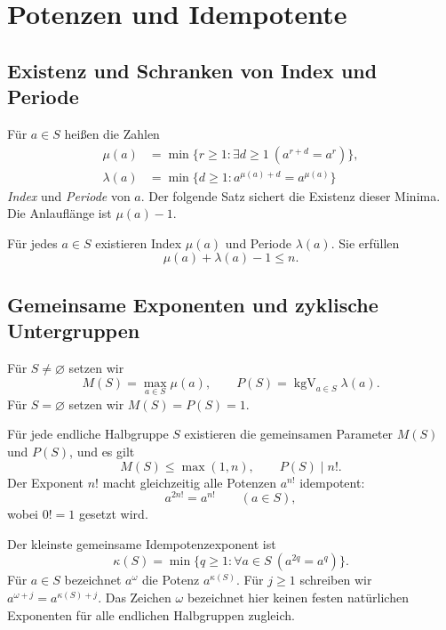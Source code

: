 \chapter{Potenzen und Idempotente}

\section{Existenz und Schranken von Index und Periode}

\begin{definition}
Für $a\in S$ heißen die Zahlen
\begin{align*}
 \mu(a)&=\min\{r\geq1:\exists d\geq1\ (a^{r+d}=a^r)\},\\
 \lambda(a)&=\min\{d\geq1:a^{\mu(a)+d}=a^{\mu(a)}\}
\end{align*}
\emph{Index} und \emph{Periode} von $a$. Der folgende Satz sichert die
Existenz dieser Minima. Die Anlauflänge ist $\mu(a)-1$.
\end{definition}

\begin{theorem}\label{guide:period}
Für jedes $a\in S$ existieren Index $\mu(a)$ und Periode $\lambda(a)$.
Sie erfüllen
\[
 \mu(a)+\lambda(a)-1\leq n.
\]
\cite{projectindex,harju}
\end{theorem}

\section{Gemeinsame Exponenten und zyklische Untergruppen}

\begin{definition}
Für $S\ne\varnothing$ setzen wir
\[
 M(S)=\max_{a\in S}\mu(a),\qquad
 P(S)=\operatorname{kgV}_{a\in S}\lambda(a).
\]
Für $S=\varnothing$ setzen wir $M(S)=P(S)=1$.
\end{definition}

\begin{theorem}\label{guide:uniform}
Für jede endliche Halbgruppe $S$ existieren die gemeinsamen Parameter
$M(S)$ und $P(S)$, und es gilt
\[
 M(S)\leq\max(1,n),\qquad P(S)\mid n!.
\]
Der Exponent $n!$ macht gleichzeitig alle Potenzen $a^{n!}$ idempotent:
\[
 a^{2n!}=a^{n!}\qquad(a\in S),
\]
wobei $0!=1$ gesetzt wird. \cite{projectindex,pin}
\end{theorem}

\begin{definition}
Der kleinste gemeinsame Idempotenzexponent ist
\[
 \kappa(S)=\min\{q\geq1:\forall a\in S\ (a^{2q}=a^q)\}.
\]
Für $a\in S$ bezeichnet $a^\omega$ die Potenz $a^{\kappa(S)}$.
Für $j\geq1$ schreiben wir $a^{\omega+j}=a^{\kappa(S)+j}$.
Das Zeichen $\omega$ bezeichnet hier keinen festen natürlichen Exponenten
für alle endlichen Halbgruppen zugleich.
\end{definition}

